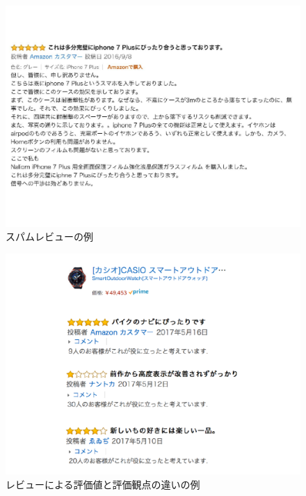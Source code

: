 \documentclass[a4paper,11pt,oneside,openany]{jsbook}
\begin{document}
\begin{figure}[htb]
	\begin{center} %
		\includegraphics[width = 120mm]{figures/spam_review.pdf} %
	\end{center}
	\caption{スパムレビューの例} %
	\label{fig:spam} %
\end{figure}

\begin{figure}[htb]
	\begin{center} %
		\includegraphics[width = 120mm]{figures/review_example.pdf} %
	\end{center}
	\caption{レビューによる評価値と評価観点の違いの例} %
	\label{fig:review_example} %
\end{figure}
\end{document}
